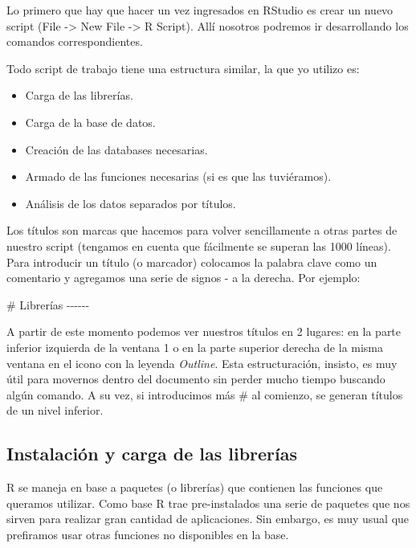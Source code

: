 \documentclass[
  letterpaper,
  DIV=11,
  numbers=noendperiod]{scrartcl}
\newenvironment{Shaded}{\begin{snugshade}}{\end{snugshade}}
\newcommand{\CommentTok}[1]{\textcolor[rgb]{0.37,0.37,0.37}{#1}}
\providecommand{\tightlist}{%
  \setlength{\itemsep}{0pt}\setlength{\parskip}{0pt}}\usepackage{longtable,booktabs,array}
\begin{document}
Lo primero que hay que hacer un vez ingresados en RStudio es crear un
nuevo script (File -\textgreater{} New File -\textgreater{} R Script).
Allí nosotros podremos ir desarrollando los comandos correspondientes.

Todo script de trabajo tiene una estructura similar, la que yo utilizo
es:

\begin{itemize}
\tightlist
\item
  Carga de las librerías.
\item
  Carga de la base de datos.
\item
  Creación de las databases necesarias.
\item
  Armado de las funciones necesarias (si es que las tuviéramos).
\item
  Análisis de los datos separados por títulos.
\end{itemize}

Los títulos son marcas que hacemos para volver sencillamente a otras
partes de nuestro script (tengamos en cuenta que fácilmente se superan
las 1000 líneas). Para introducir un título (o marcador) colocamos la
palabra clave como un comentario y agregamos una serie de signos - a la
derecha. Por ejemplo:

\begin{Shaded}
\begin{Highlighting}[]
\CommentTok{\# Librerías {-}{-}{-}{-}{-}{-}}
\end{Highlighting}
\end{Shaded}

A partir de este momento podemos ver nuestros títulos en 2 lugares: en
la parte inferior izquierda de la ventana 1 o en la parte superior
derecha de la misma ventana en el icono con la leyenda \emph{Outline}.
Esta estructuración, insisto, es muy útil para movernos dentro del
documento sin perder mucho tiempo buscando algún comando. A su vez, si
introducimos más \# al comienzo, se generan títulos de un nivel
inferior.

\hypertarget{instalaciuxf3n-y-carga-de-las-libreruxedas}{%
\subsection{Instalación y carga de las
librerías}\label{instalaciuxf3n-y-carga-de-las-libreruxedas}}

R se maneja en base a paquetes (o librerías) que contienen las funciones
que queramos utilizar. Como base R trae pre-instalados una serie de
paquetes que nos sirven para realizar gran cantidad de aplicaciones. Sin
embargo, es muy usual que prefiramos usar otras funciones no disponibles
en la base.
\end{document}
